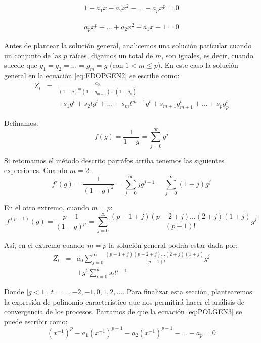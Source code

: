 \documentclass[
]{book}
\begin{document}
\begin{eqnarray}
    1 - a_1 x - a_2 x^2 - \ldots - a_p x^p = 0
    \label{eq:POLGEN2}
\end{eqnarray}

\begin{eqnarray}
    a_p x^p + \ldots + a_2 x^2 + a_1 x - 1 = 0
    \label{eq:POLGEN3}
\end{eqnarray}

Antes de plantear la solución general, analicemos una solución patícular cuando un conjunto de las \(p\) raíces, digamos un total de \(m\), son iguales, es decir, cuando sucede que \(g_1 = g_2 = \ldots = g_m = g\) (con \(1 < m \leq p\)). En este caso la solución general en la ecuación \eqref{eq:EDOPGEN2} se escribe como:
\begin{eqnarray}
    Z_t & = & \frac{a_0}{(1 - g)^m(1 - g_{m+1}) \ldots (1 - g_p)} \nonumber \\ 
    & & + s_1 g^t + s_2 t g^t + \ldots + s_m t^{m-1} g^t + s_{m+1} g^t_{m+1} + \ldots + s_{p} g^t_{p}
    \label{eq:EDOPGEN3}
\end{eqnarray}

Definamos:
\begin{equation}
    f(g) = \frac{1}{1 - g} = \sum_{j = 0}^{\infty} g^j
    \label{eq:EDOPGEN4}
\end{equation}

Si retomamos el método descrito parráfos arriba tenemos las siguientes expresiones. Cuando \(m = 2\):
\begin{equation}
    f'(g) = \frac{1}{(1 - g)^2} = \sum_{j = 0}^{\infty} j g^{j-1} = \sum_{j = 0}^{\infty} (1 + j) g^j \nonumber
\end{equation}

En el otro extremo, cuando \(m = p\):
\begin{equation}
    f^{(p-1)}(g) = \frac{p-1}{(1 - g)^p} = \sum_{j = 0}^{\infty} \frac{(p-1+j)(p-2+j) \ldots (2+j)(1+j)}{(p-1)!} g^j
    \label{eq:EDOPGEN5}
\end{equation}

Así, en el extremo cuando \(m = p\) la solución general podría estar dada por:
\begin{eqnarray}
    Z_t & = & a_0 \sum_{j = 0}^{\infty} \frac{(p-1+j)(p-2+j) \ldots (2+j)(1+j)}{(p-1)!} g^j \nonumber \\
    & & + g^t \sum_{i = 0}^p s_i t^{i-1}
    \label{eq:EDOPGEN6}
\end{eqnarray}

Donde \(|{g} < 1|\), \(t = \ldots, -2, -1, 0, 1, 2, \ldots\). Para finalizar esta sección, plantearemos la expresión de polinomio característico que nos permitirá hacer el análisis de convergencia de los procesos. Partamos de que la ecuación \eqref{eq:POLGEN3} se puede escribir como:
\begin{equation}
    (x^{-1})^p - a_1 (x^{-1})^{p-1} - a_2 (x^{-1})^{p-1} - \ldots - a_p = 0
    \label{eq:POLGEN55}
\end{equation}
\end{document}
